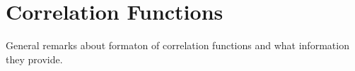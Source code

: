 \documentclass[../AnalysisNoteJBuxton.tex]{subfiles}
\begin{document}
\section{Correlation Functions}
\label{CorrelationFunctions}

General remarks about formaton of correlation functions and what information they provide.
\end{document}
